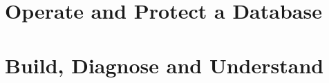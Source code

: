 \documentclass[11pt,a4paper,oneside,openany]{book}
\begin{document}
\part{Operate and Protect a Database}




\part{Build, Diagnose and Understand}





\appendix

\backmatter
\printindex
\end{document}
